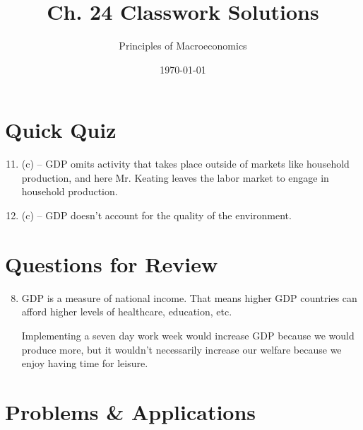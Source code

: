 \documentclass{article}
\title{Ch. 24 Classwork Solutions}
\author{Principles of Macroeconomics}
\date{\today}
\begin{document}
\maketitle

\section*{Quick Quiz}

\begin{enumerate}

\setcounter{enumi}{10}
\item (c) -- GDP omits activity that takes place outside of markets like household production, and here Mr. Keating leaves the labor market to engage in household production.

\item (c) -- GDP doesn't account for the quality of the environment. 

\end{enumerate}

\section*{Questions for Review}

\begin{enumerate}

\setcounter{enumi}{7}
\item GDP is a measure of national income. That means higher GDP countries can afford higher levels of healthcare, education, etc. 

Implementing a seven day work week would increase GDP because we would produce more, but it wouldn't necessarily increase our welfare because we enjoy having time for leisure.

\end{enumerate}

\section*{Problems \& Applications}
\end{document}
